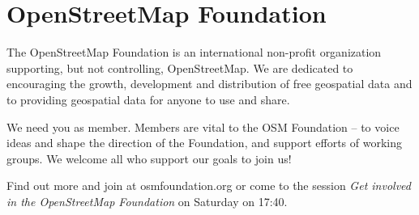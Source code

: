 \newpage
\section*{OpenStreetMap Foundation}
\label{osmf}
\pagestyle{osmf}
The OpenStreetMap Foundation is an
international non-profit organization
supporting, but not controlling,
OpenStreetMap. We are dedicated to
encouraging the growth, development and
distribution of free geospatial data and to
providing geospatial data for anyone to use
and share.

We need you as member. Members are vital
to the OSM Foundation -- to voice ideas
and shape the direction of the Foundation,
and support efforts of working groups. We
welcome all who support our goals to join us!

Find out more and join at osmfoundation.org
or come to the session \emph{Get involved in the OpenStreetMap Foundation} on Saturday on 17:40.
